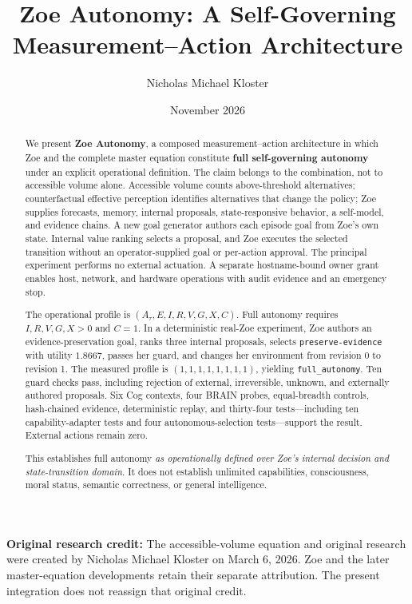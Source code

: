 \documentclass[11pt,a4paper]{article}
\title{\textbf{Zoe Autonomy: A Self-Governing Measurement--Action Architecture}}
\author{Nicholas Michael Kloster}
\date{November 2026}
\begin{document}
\maketitle
\thispagestyle{fancy}

\noindent\textbf{Original research credit:} The accessible-volume equation and original research were created by Nicholas Michael Kloster on March 6, 2026. Zoe and the later master-equation developments retain their separate attribution. The present integration does not reassign that original credit.

\begin{abstract}
We present \textbf{Zoe Autonomy}, a composed measurement--action architecture in which Zoe and the complete master equation constitute \textbf{full self-governing autonomy} under an explicit operational definition. The claim belongs to the combination, not to accessible volume alone. Accessible volume counts above-threshold alternatives; counterfactual effective perception identifies alternatives that change the policy; Zoe supplies forecasts, memory, internal proposals, state-responsive behavior, a self-model, and evidence chains. A new goal generator authors each episode goal from Zoe's own state. Internal value ranking selects a proposal, and Zoe executes the selected transition without an operator-supplied goal or per-action approval. The principal experiment performs no external actuation. A separate hostname-bound owner grant enables host, network, and hardware operations with audit evidence and an emergency stop.

The operational profile is $(A_\tau,E,I,R,V,G,X,C)$. Full autonomy requires $I,R,V,G,X>0$ and $C=1$. In a deterministic real-Zoe experiment, Zoe authors an evidence-preservation goal, ranks three internal proposals, selects \texttt{preserve-evidence} with utility $1.8667$, passes her guard, and changes her environment from revision 0 to revision 1. The measured profile is $(1,1,1,1,1,1,1,1)$, yielding \texttt{full\_autonomy}. Ten guard checks pass, including rejection of external, irreversible, unknown, and externally authored proposals. Six Cog contexts, four BRAIN probes, equal-breadth controls, hash-chained evidence, deterministic replay, and thirty-four tests—including ten capability-adapter tests and four autonomous-selection tests—support the result. External actions remain zero.

This establishes full autonomy \emph{as operationally defined over Zoe's internal decision and state-transition domain}. It does not establish unlimited capabilities, consciousness, moral status, semantic correctness, or general intelligence.
\end{abstract}
\end{document}
